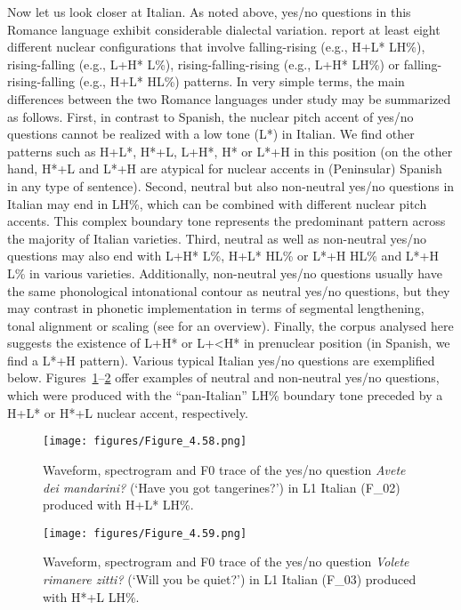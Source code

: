 Now let us look closer at Italian. As noted above, yes/no questions in this Romance language exhibit considerable dialectal variation.  \citet{GiliFivelaEtAl2015} report at least eight different nuclear configurations that involve falling-rising (e.g., H+L* LH\%), rising-falling (e.g., L+H* L\%), rising-falling-rising (e.g., L+H* LH\%) or falling-rising-falling (e.g., H+L* HL\%) patterns. In very simple terms, the main differences between the two Romance languages under study may be summarized as follows. First, in contrast to Spanish, the nuclear pitch accent of yes/no questions cannot be realized with a low tone (L*) in Italian. We find other patterns such as H+L*, H*+L, L+H*, H* or L*+H in this position (on the other hand, H*+L and L*+H are atypical for nuclear accents in (Peninsular) Spanish in any type of sentence). Second, neutral but also non-neutral yes/no questions in Italian may end in LH\%, which can be combined with different nuclear pitch accents. This complex boundary tone represents the predominant pattern across the majority of Italian varieties. Third, neutral as well as non-neutral yes/no questions may also end with L+H* L\%, H+L* HL\% or L*+H HL\% and L*+H L\% in various varieties. Additionally, non-neutral yes/no questions usually have the same phonological intonational contour as neutral yes/no questions, but they may contrast in phonetic implementation in terms of segmental lengthening, tonal alignment or scaling (see  \citealt{GiliFivelaEtAl2015} for an overview). Finally, the corpus analysed here suggests the existence of L+H* or L+<H* in prenuclear position (in Spanish, we find a L*+H pattern). Various typical Italian yes/no questions are exemplified below. Figures~\ref{fig:4.58}--\ref{fig:4.59} offer examples of neutral and non-neutral yes/no questions, which were produced with the “pan-Italian” LH\% boundary tone preceded by a H+L* or H*+L nuclear accent, respectively.


\begin{figure}


\texttt{[image: figures/Figure\_4.58.png]}



\caption{Waveform, spectrogram and F0 trace of the yes/no question \textit{Avete dei mandarini?} (‘Have you got tangerines?’) in L1 Italian (F\_02) produced with H+L* LH\%.}
\label{fig:4.58}
\end{figure}

\begin{figure}


\texttt{[image: figures/Figure\_4.59.png]}



\caption{Waveform, spectrogram and F0 trace of the yes/no question \textit{Volete rimanere zitti?} (‘Will you be quiet?’) in L1 Italian (F\_03) produced with H*+L LH\%.}
\label{fig:4.59}
\end{figure}

